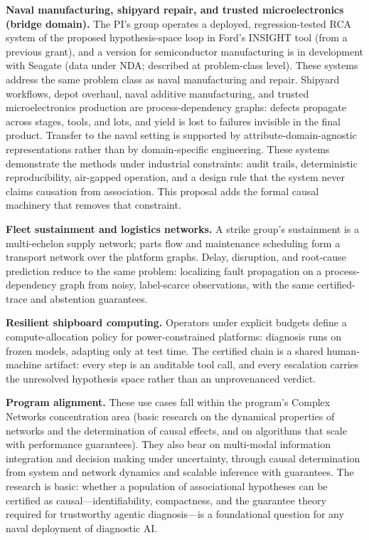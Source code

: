 \documentclass[12pt]{article}
\begin{document}
\textbf{Naval manufacturing, shipyard repair, and trusted microelectronics (bridge domain).} The PI's group operates a deployed, regression-tested RCA system of the proposed hypothesis-space loop in Ford's INSIGHT tool (from a previous grant), and a version for semiconductor manufacturing is in development with Seagate (data under NDA; described at problem-class level). These systems address the same problem class as naval manufacturing and repair. Shipyard workflows, depot overhaul, naval additive manufacturing, and trusted microelectronics production are process-dependency graphs: defects propagate across stages, tools, and lots, and yield is lost to failures invisible in the final product. Transfer to the naval setting is supported by attribute-domain-agnostic representations rather than by domain-specific engineering. These systems demonstrate the methods under industrial constraints: audit trails, deterministic reproducibility, air-gapped operation, and a design rule that the system never claims causation from association. This proposal adds the formal causal machinery that removes that constraint.

\textbf{Fleet sustainment and logistics networks.} A strike group's sustainment is a multi-echelon supply network; parts flow and maintenance scheduling form a transport network over the platform graphs. Delay, disruption, and root-cause prediction reduce to the same problem: localizing fault propagation on a process-dependency graph from noisy, label-scarce observations, with the same certified-trace and abstention guarantees.

\textbf{Resilient shipboard computing.} Operators under explicit budgets define a compute-allocation policy for power-constrained platforms: diagnosis runs on frozen models, adapting only at test time. The certified chain is a shared human-machine artifact: every step is an auditable tool call, and every escalation carries the unresolved hypothesis space rather than an unprovenanced verdict.

\textbf{Program alignment.} These use cases fall within the program's Complex Networks concentration area (basic research on the dynamical properties of networks and the determination of causal effects, and on algorithms that scale with performance guarantees). They also bear on multi-modal information integration and decision making under uncertainty, through causal determination from system and network dynamics and scalable inference with guarantees. The research is basic: whether a population of associational hypotheses can be certified as causal---identifiability, compactness, and the guarantee theory required for trustworthy agentic diagnosis---is a foundational question for any naval deployment of diagnostic AI.
\end{document}
